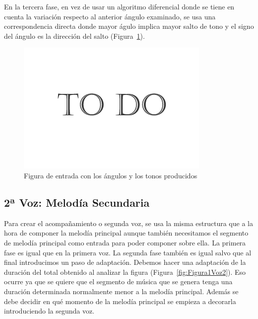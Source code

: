 En la tercera fase, en vez de usar un algoritmo diferencial donde se tiene en cuenta la variación respecto al anterior ángulo examinado, se usa una correspondencia directa donde mayor águlo implica mayor salto de tono y el signo del ángulo es la dirección del salto (Figura~\ref{fig:Figura6Voz1}).

		\begin{figure}[htbp]
		\centering
		\hspace*{0.0in}
		\includegraphics[scale=0.57]{graphics/todo.png}
		\caption{Figura de entrada con los ángulos y los tonos producidos}
		\label{fig:Figura6Voz1}
		\end{figure}


\subsection{2ª Voz: Melodía Secundaria}

Para crear el acompañamiento o segunda voz, se usa la misma estructura que a la hora de componer la melodía principal aunque también necesitamos el segmento de melodía principal como entrada para poder componer sobre ella. 
La primera fase es igual que en la primera voz. La segunda fase también es igual salvo que al final introducimos un paso de adaptación. Debemos hacer una adaptación de la duración del total obtenido al analizar la figura (Figura~\ref{fig:Figura1Voz2}). Eso ocurre ya que se quiere que el segmento de música que se genera tenga una duración determinada normalmente menor a la melodía principal. Además se debe decidir en qué momento de la melodía principal se empieza a decorarla introduciendo la segunda voz.

